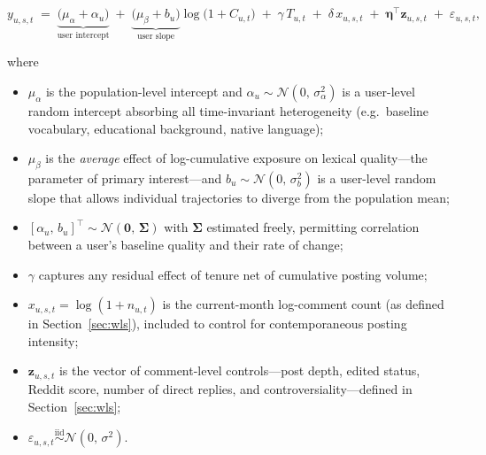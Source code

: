 \begin{equation}
  y_{u,s,t}
  \;=\;
  \underbrace{\bigl(\mu_{\alpha} + \alpha_{u}\bigr)}_{\text{user intercept}}
  \;+\;
  \underbrace{\bigl(\mu_{\beta} + b_{u}\bigr)}_{\text{user slope}}
  \log\!\bigl(1 + C_{u,t}\bigr)
  \;+\;
  \gamma\,T_{u,t}
  \;+\;
  \delta\,x_{u,s,t}
  \;+\;
  \boldsymbol{\eta}^{\!\top}\mathbf{z}_{u,s,t}
  \;+\;
  \varepsilon_{u,s,t},
  \label{eq:longitudinal}
\end{equation}

where

\begin{itemize}
  \item $\mu_{\alpha}$ is the population-level intercept and
        $\alpha_{u} \sim \mathcal{N}(0,\,\sigma_{\alpha}^{2})$ is a
        user-level random intercept absorbing all time-invariant
        heterogeneity (e.g.\ baseline vocabulary, educational
        background, native language);

  \item $\mu_{\beta}$ is the \emph{average} effect of log-cumulative
        exposure on lexical quality---the parameter of primary
        interest---and $b_{u} \sim \mathcal{N}(0,\,\sigma_{b}^{2})$
        is a user-level random slope that allows individual
        trajectories to diverge from the population mean;

  \item $[\alpha_{u},\, b_{u}]^{\top} \sim
        \mathcal{N}\!\left(\mathbf{0},\,\boldsymbol{\Sigma}\right)$
        with $\boldsymbol{\Sigma}$ estimated freely, permitting
        correlation between a user's baseline quality and their
        rate of change;

  \item $\gamma$ captures any residual effect of tenure net of
        cumulative posting volume;

  \item $x_{u,s,t} = \log(1 + n_{u,t})$ is the current-month
        log-comment count (as defined in Section~\ref{sec:wls}),
        included to control for contemporaneous posting intensity;

  \item $\mathbf{z}_{u,s,t}$ is the vector of comment-level
        controls---post depth, edited status, Reddit score, number
        of direct replies, and controversiality---defined in
        Section~\ref{sec:wls};

  \item $\varepsilon_{u,s,t} \overset{\mathrm{iid}}{\sim}
        \mathcal{N}(0,\,\sigma^{2})$.
\end{itemize}

